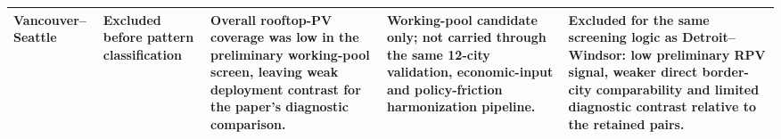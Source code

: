 \begin{tabular}{@{}p{2.6cm}p{1.8cm}p{3.0cm}p{3.1cm}p{4.1cm}@{}}
Vancouver--Seattle & Excluded before pattern classification & Overall rooftop-PV coverage was low in the preliminary working-pool screen, leaving weak deployment contrast for the paper's diagnostic comparison. & Working-pool candidate only; not carried through the same 12-city validation, economic-input and policy-friction harmonization pipeline. & Excluded for the same screening logic as Detroit--Windsor: low preliminary RPV signal, weaker direct border-city comparability and limited diagnostic contrast relative to the retained pairs. \\
\bottomrule
\end{tabular}
